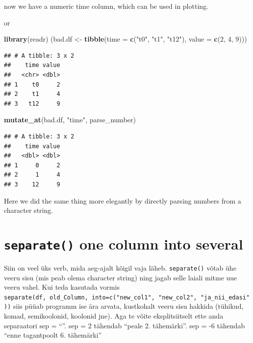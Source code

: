 \documentclass[]{book}
\newenvironment{Shaded}{\begin{snugshade}}{\end{snugshade}}
\newcommand{\KeywordTok}[1]{\textcolor[rgb]{0.13,0.29,0.53}{\textbf{#1}}}
\newcommand{\DataTypeTok}[1]{\textcolor[rgb]{0.13,0.29,0.53}{#1}}
\newcommand{\DecValTok}[1]{\textcolor[rgb]{0.00,0.00,0.81}{#1}}
\newcommand{\StringTok}[1]{\textcolor[rgb]{0.31,0.60,0.02}{#1}}
\newcommand{\NormalTok}[1]{#1}
\begin{document}
now we have a numeric time column, which can be used in plotting.

or

\begin{Shaded}
\begin{Highlighting}[]
\KeywordTok{library}\NormalTok{(readr)}
\NormalTok{(bad.df <-}\StringTok{ }\KeywordTok{tibble}\NormalTok{(}\DataTypeTok{time =} \KeywordTok{c}\NormalTok{(}\StringTok{"t0"}\NormalTok{, }\StringTok{"t1"}\NormalTok{, }\StringTok{"t12"}\NormalTok{), }\DataTypeTok{value =} \KeywordTok{c}\NormalTok{(}\DecValTok{2}\NormalTok{, }\DecValTok{4}\NormalTok{, }\DecValTok{9}\NormalTok{)))}
\end{Highlighting}
\end{Shaded}

\begin{verbatim}
## # A tibble: 3 x 2
##    time value
##   <chr> <dbl>
## 1    t0     2
## 2    t1     4
## 3   t12     9
\end{verbatim}

\begin{Shaded}
\begin{Highlighting}[]
\KeywordTok{mutate_at}\NormalTok{(bad.df, }\StringTok{"time"}\NormalTok{, parse_number)}
\end{Highlighting}
\end{Shaded}

\begin{verbatim}
## # A tibble: 3 x 2
##    time value
##   <dbl> <dbl>
## 1     0     2
## 2     1     4
## 3    12     9
\end{verbatim}

Here we did the same thing more elegantly by directly parsing numbers
from a character string.

\section{\texorpdfstring{\texttt{separate()} one column into
several}{separate() one column into several}}\label{separate-one-column-into-several}

Siin on veel üks verb, mida aeg-ajalt kõigil vaja läheb.
\texttt{separate()} võtab ühe veeru sisu (mis peab olema character
string) ning jagab selle laiali mitme uue veeru vahel. Kui teda kasutada
vormis
\texttt{separate(df,\ old\_Column,\ into=c("new\_col1",\ "new\_col2",\ "ja\_nii\_edasi"))}
siis püüab programm ise ära arvata, kustkohalt veeru sisu hakkida
(tühikud, komad, semikoolonid, koolonid jne). Aga te võite
eksplitsiitselt ette anda separaatori sep = ``''. sep = 2 tähendab
``peale 2. tähemärki''. sep = -6 tähendab ``enne tagantpoolt 6.
tähemärki''
\end{document}
